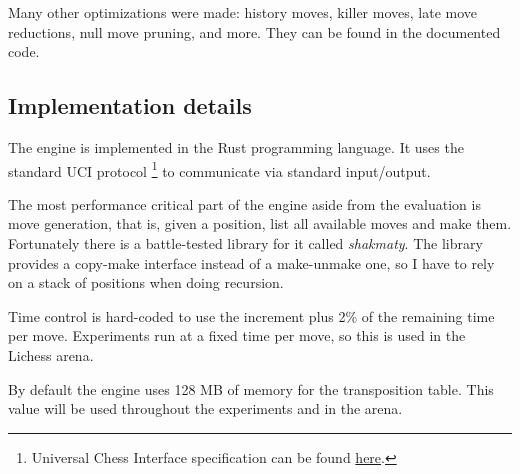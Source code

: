 Many other optimizations were made: history moves, killer moves, late move reductions, null move pruning, and more. They can be found in the documented code.


\subsection{Implementation details}


The engine is implemented in the Rust programming language. It uses the standard UCI protocol \footnote{Universal Chess Interface specification can be found \href{https://www.shredderchess.com/chess-features/uci-universal-chess-interface.html}{here}.} to communicate via standard input/output.

The most performance critical part of the engine aside from the evaluation is move generation, that is, given a position, list all available moves and make them.
Fortunately there is a battle-tested library for it called \textit{shakmaty}. The library provides a copy-make interface instead of a make-unmake one, so I have to rely on a stack of positions when doing recursion.

Time control is hard-coded to use the increment plus 2\% of the remaining time per move. Experiments run at a fixed time per move, so this is used in the Lichess arena.

By default the engine uses 128 MB of memory for the transposition table. This value will be used throughout the experiments and in the arena.

